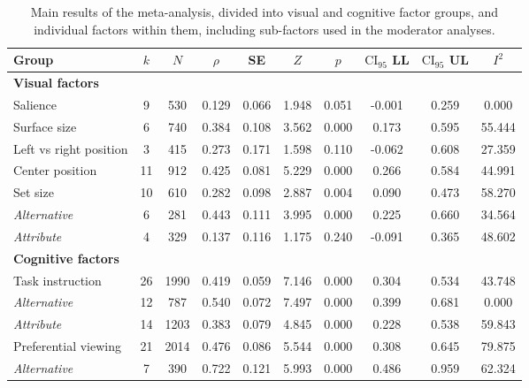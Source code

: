 \begin{table}[ht]
\centering
\caption{Main results of the meta-analysis, divided into visual and cognitive factor groups, and individual factors within them, including sub-factors used in the moderator analyses.} 
\label{tab:main_results}
\begin{tabular}{lccccccccc}
  \hline
Group & $k$ & $N$ & $\rho$ & SE & $Z$ & $p$ & $\textrm{CI}_{95}$ LL & $\textrm{CI}_{95}$ UL & $I^2$ \\ 
  \hline
\textbf{Visual factors} &  &  &  &  &  &  &  &  &  \\ 
  Salience & 9 & 530 & 0.129 & 0.066 & 1.948 & 0.051 & -0.001 & 0.259 & 0.000 \\ 
  Surface size & 6 & 740 & 0.384 & 0.108 & 3.562 & 0.000 & 0.173 & 0.595 & 55.444 \\ 
  Left vs right position & 3 & 415 & 0.273 & 0.171 & 1.598 & 0.110 & -0.062 & 0.608 & 27.359 \\ 
  Center position & 11 & 912 & 0.425 & 0.081 & 5.229 & 0.000 & 0.266 & 0.584 & 44.991 \\ 
  Set size & 10 & 610 & 0.282 & 0.098 & 2.887 & 0.004 & 0.090 & 0.473 & 58.270 \\ 
  \hspace{2mm}\textit{Alternative} & 6 & 281 & 0.443 & 0.111 & 3.995 & 0.000 & 0.225 & 0.660 & 34.564 \\ 
  \hspace{2mm}\textit{Attribute} & 4 & 329 & 0.137 & 0.116 & 1.175 & 0.240 & -0.091 & 0.365 & 48.602 \\ 
  \textbf{Cognitive factors} &  &  &  &  &  &  &  &  &  \\ 
  Task instruction & 26 & 1990 & 0.419 & 0.059 & 7.146 & 0.000 & 0.304 & 0.534 & 43.748 \\ 
  \hspace{2mm}\textit{Alternative} & 12 & 787 & 0.540 & 0.072 & 7.497 & 0.000 & 0.399 & 0.681 & 0.000 \\ 
  \hspace{2mm}\textit{Attribute} & 14 & 1203 & 0.383 & 0.079 & 4.845 & 0.000 & 0.228 & 0.538 & 59.843 \\ 
  Preferential viewing & 21 & 2014 & 0.476 & 0.086 & 5.544 & 0.000 & 0.308 & 0.645 & 79.875 \\ 
  \hspace{2mm}\textit{Alternative} & 7 & 390 & 0.722 & 0.121 & 5.993 & 0.000 & 0.486 & 0.959 & 62.324 \\ 

\end{tabular}
\end{table}
